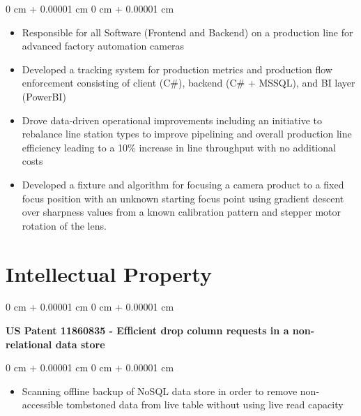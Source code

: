 \documentclass[10pt, letterpaper]{article}
\newenvironment{highlights}{
    \begin{itemize}[
        topsep=0.10 cm,
        parsep=0.10 cm,
        partopsep=0pt,
        itemsep=0pt,
        leftmargin=0 cm + 10pt
    ]
}{
    \end{itemize}
} %
\newenvironment{onecolentry}{
    \begin{adjustwidth}{
        0 cm + 0.00001 cm
    }{
        0 cm + 0.00001 cm
    }
}{
    \end{adjustwidth}
} %
\newenvironment{twocolentry}[2][]{
    \onecolentry
    \def\secondColumn{#2}
    \setcolumnwidth{\fill, 4.5 cm}
    \begin{paracol}{2}
}{
    \switchcolumn \raggedleft \secondColumn
    \end{paracol}
    \endonecolentry
} %
\begin{document}
        \vspace{0.10 cm}
        \begin{onecolentry}
            \begin{highlights}
                \item Responsible for all Software (Frontend and Backend) on a production line for advanced factory automation cameras
                \item Developed a tracking system for production metrics and production flow enforcement consisting of client (C\#), backend (C\# + MSSQL), and BI layer (PowerBI)
                \item Drove data-driven operational improvements including an initiative to rebalance line station types to improve pipelining and overall production line efficiency leading to a 10\% increase in line throughput with no additional costs
                \item Developed a fixture and algorithm for focusing a camera product to a fixed focus position with an unknown starting focus point using gradient descent over sharpness values from a known calibration pattern and stepper motor rotation of the lens.
            \end{highlights}
        \end{onecolentry}

    
    \section{Intellectual Property}

        \begin{samepage}
            \begin{twocolentry}{
            
            }
                \textbf{US Patent 11860835 - Efficient drop column requests in a non-relational data store}
            \end{twocolentry}

            \vspace{0.10 cm}
            
            \begin{onecolentry}
                \begin{highlights}
                    \item Scanning offline backup of NoSQL data store in order to remove non-accessible tombstoned data from live table without using live read capacity
                \end{highlights}
            \end{onecolentry}
        \end{samepage}
\end{document}
